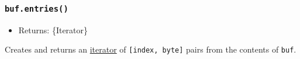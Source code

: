 \begin{Shaded}
\begin{Highlighting}[]
\NormalTok{ \{ }\NormalTok{ \} }\OperatorTok{=} \NormalTok{(}\NormalTok{)}\OperatorTok{;}


\OperatorTok{=} \NormalTok{(}\NormalTok{)}\OperatorTok{;}

\NormalTok{ (}\OperatorTok{=} \OperatorTok{;}\OperatorTok{\textless{}} \OperatorTok{;}\OperatorTok{++}\NormalTok{) \{}
\OperatorTok{=}\OperatorTok{+} \OperatorTok{;}
\NormalTok{\}}

\OperatorTok{,} \OperatorTok{,} \OperatorTok{,} \NormalTok{)}\OperatorTok{;}

\NormalTok{())}\OperatorTok{;}
\end{Highlighting}
\end{Shaded}

\subsubsection{\texorpdfstring{\texttt{buf.entries()}}{buf.entries()}}\label{buf.entries}

\begin{itemize}
\tightlist
\item
  Returns: \{Iterator\}
\end{itemize}

Creates and returns an
\href{https://developer.mozilla.org/en-US/docs/Web/JavaScript/Reference/Iteration_protocols}{iterator}
of \texttt{{[}index,\ byte{]}} pairs from the contents of \texttt{buf}.

